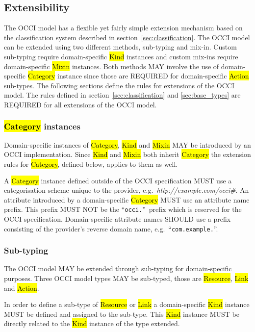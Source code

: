 \documentclass[10pt,a4paper,british]{article}
\begin{document}
\subsection{Extensibility}
\label{sec:extensibility}
The OCCI model has a flexible yet fairly simple extension mechanism based on
the classification system described in section~\ref{sec:classification}.
%
The OCCI model can be extended using two different methods, sub-typing and
mix-in. Custom sub-typing require domain-specific \hl{Kind} instances and
custom mix-ins require domain-specific \hl{Mixin} instances.  Both methods MAY
involve the use of domain-specific \hl{Category} instance since those are
REQUIRED for domain-specific \hl{Action} sub-types.  The following sections
define the rules for extensions of the OCCI model.
%
The rules defined in section~\ref{sec:classification} and \ref{sec:base_types}
are REQUIRED for all extensions of the OCCI model.

\subsubsection{\hl{Category} instances}
\label{sec:ext:category}
Domain-specific instances of \hl{Category}, \hl{Kind} and \hl{Mixin} MAY be
introduced by an OCCI implementation. Since \hl{Kind} and \hl{Mixin} both
inherit \hl{Category} the extension rules for \hl{Category}, defined below,
applies to them as well.

A \hl{Category} instance defined outside of the OCCI specification MUST use a
categorisation scheme unique to the provider,
e.g.~\textit{http://example.com/occi\#}.
%
An attribute introduced by a domain-specific \hl{Category} MUST
use an attribute name prefix. This prefix MUST NOT be the ``\texttt{occi.}''~prefix
which is reserved for the OCCI specification. Domain-specific attribute names
SHOULD use a prefix consisting of the provider's reverse domain name,
e.g.~``\texttt{com.example.}''.

\subsubsection{Sub-typing}
The OCCI model MAY be extended through sub-typing for domain-specific purposes.
Three OCCI model types MAY be sub-typed, those are \hl{Resource}, \hl{Link} and
\hl{Action}.

In order to define a sub-type of \hl{Resource} or \hl{Link} a domain-specific
\hl{Kind} instance MUST be defined and assigned to the sub-type. This
\hl{Kind} instance MUST be directly related to the \hl{Kind} instance of the
type extended.
\end{document}
